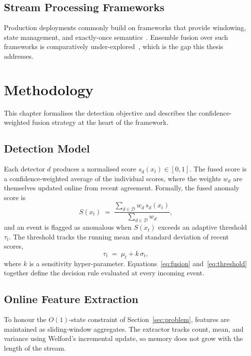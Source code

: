 \documentclass[12pt,a4paper,oneside]{report}
\begin{document}
\section{Stream Processing Frameworks}
\label{sec:lit-streaming}
Production deployments commonly build on frameworks that provide windowing,
state management, and exactly-once semantics~\cite{carbone2015flink}.
Ensemble fusion over such frameworks is comparatively
under-explored~\cite{aggarwal2017outlier}, which is the gap this thesis
addresses.

\chapter{Methodology}
\label{ch:methodology}

This chapter formalises the detection objective and describes the
confidence-weighted fusion strategy at the heart of the framework.

\section{Detection Model}
\label{sec:method-model}
Each detector $d$ produces a normalised score $s_d(x_t) \in [0,1]$. The fused
score is a confidence-weighted average of the individual scores, where the
weights $w_d$ are themselves updated online from recent agreement. Formally,
the fused anomaly score is
\begin{equation}
  S(x_t) \;=\; \frac{\sum_{d \in \mathcal{D}} w_d \, s_d(x_t)}
                    {\sum_{d \in \mathcal{D}} w_d},
  \label{eq:fusion}
\end{equation}
and an event is flagged as anomalous when $S(x_t)$ exceeds an adaptive
threshold $\tau_t$. The threshold tracks the running mean and standard
deviation of recent scores,
\begin{equation}
  \tau_t \;=\; \mu_t + k\,\sigma_t,
  \label{eq:threshold}
\end{equation}
where $k$ is a sensitivity hyper-parameter. Equations~\eqref{eq:fusion}
and~\eqref{eq:threshold} together define the decision rule evaluated at every
incoming event.

\section{Online Feature Extraction}
\label{sec:method-features}
To honour the $O(1)$-state constraint of Section~\ref{sec:problem}, features
are maintained as sliding-window aggregates. The extractor tracks count, mean,
and variance using Welford's incremental update, so memory does not grow with
the length of the stream.
\end{document}

